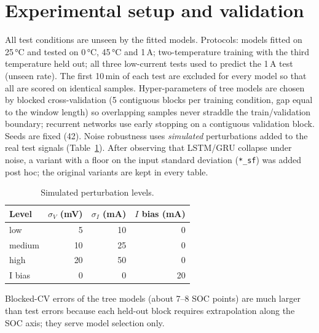 \section{Experimental setup and validation}
All test conditions are unseen by the fitted models. Protocols: models fitted on 25\,°C and tested on 0\,°C, 45\,°C and 1\,A; two-temperature training with the third temperature held out; all three low-current tests used to predict the 1\,A test (unseen rate). The first 10\,min of each test are excluded for every model so that all are scored on identical samples. Hyper-parameters of tree models are chosen by blocked cross-validation (5 contiguous blocks per training condition, gap equal to the window length) so overlapping samples never straddle the train/validation boundary; recurrent networks use early stopping on a contiguous validation block. Seeds are fixed (42). Noise robustness uses \emph{simulated} perturbations added to the real test signals (Table~\ref{tab:noisedef}). After observing that LSTM/GRU collapse under noise, a variant with a floor on the input standard deviation (\texttt{*\_sf}) was added post hoc; the original variants are kept in every table.
\begin{table}[H]\centering\small
\begin{tabular}{lrrr}\toprule Level & $\sigma_V$ (mV) & $\sigma_I$ (mA) & $I$ bias (mA)\\\midrule low & 5 & 10 & 0\\ medium & 10 & 25 & 0\\ high & 20 & 50 & 0\\ I bias & 0 & 0 & 20\\\bottomrule\end{tabular}
\caption{Simulated perturbation levels.}\label{tab:noisedef}\end{table}
Blocked-CV errors of the tree models (about 7--8 SOC points) are much larger than test errors because each held-out block requires extrapolation along the SOC axis; they serve model selection only.
